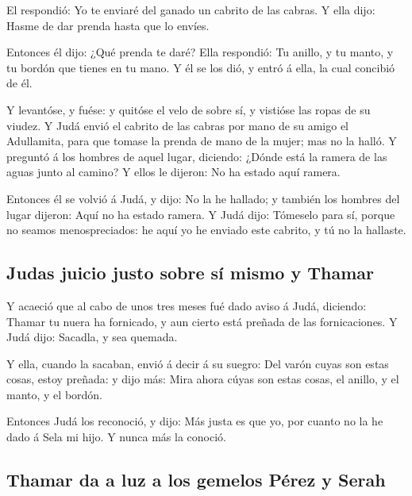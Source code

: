  El respondió: Yo te enviaré del ganado un cabrito de las
cabras. Y ella dijo: Hasme de dar prenda hasta que lo envíes.

 Entonces él dijo: ¿Qué prenda te daré? Ella respondió:
Tu anillo, y tu manto, y tu bordón que tienes en tu mano. Y él se los
dió, y entró á ella, la cual concibió de él.

 Y levantóse, y fuése: y quitóse el velo de sobre sí, y
vistióse las ropas de su viudez.  Y Judá envió el cabrito
de las cabras por mano de su amigo el Adullamita, para que tomase la
prenda de mano de la mujer; mas no la halló.  Y preguntó
á los hombres de aquel lugar, diciendo: ¿Dónde está la ramera de las
aguas junto al camino? Y ellos le dijeron: No ha estado aquí ramera.

 Entonces él se volvió á Judá, y dijo: No la he hallado;
y también los hombres del lugar dijeron: Aquí no ha estado ramera.
 Y Judá dijo: Tómeselo para sí, porque no seamos
menospreciados: he aquí yo he enviado este cabrito, y tú no la hallaste.

\hypertarget{judas-juicio-justo-sobre-suxed-mismo-y-thamar}{%
\subsection{Judas juicio justo sobre sí mismo y
Thamar}\label{judas-juicio-justo-sobre-suxed-mismo-y-thamar}}

 Y acaeció que al cabo de unos tres meses fué dado aviso
á Judá, diciendo: Thamar tu nuera ha fornicado, y aun cierto está
preñada de las fornicaciones. Y Judá dijo: Sacadla, y sea quemada.

 Y ella, cuando la sacaban, envió á decir á su suegro:
Del varón cuyas son estas cosas, estoy preñada: y dijo más: Mira ahora
cúyas son estas cosas, el anillo, y el manto, y el bordón.

 Entonces Judá los reconoció, y dijo: Más justa es que
yo, por cuanto no la he dado á Sela mi hijo. Y nunca más la conoció.

\hypertarget{thamar-da-a-luz-a-los-gemelos-puxe9rez-y-serah}{%
\subsection{Thamar da a luz a los gemelos Pérez y
Serah}\label{thamar-da-a-luz-a-los-gemelos-puxe9rez-y-serah}}

